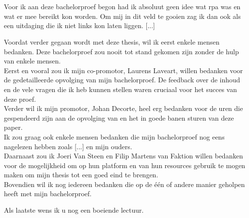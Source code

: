 
\chapter*{}
\label{ch:voorwoord}

Voor ik aan deze bachelorproef begon had ik absoluut geen idee wat \acrlong{rpa} was en wat er mee bereikt kon worden. Om mij in dit veld te gooien zag ik dan ook als een uitdaging die ik niet links kon laten liggen. [...]

Voordat verder gegaan wordt met deze thesis, wil ik eerst enkele mensen bedanken. Deze bachelorproef zou nooit tot stand gekomen zijn zonder de hulp van enkele mensen.\\
Eerst en vooral zou ik mijn co-promotor, Laurens Laveart, willen bedanken voor de gedetailleerde
opvolging van mijn bachelorproef. De feedback over de inhoud en de vele vragen die ik heb kunnen stellen waren cruciaal voor het succes van deze proef.\\
Verder wil ik mijn promotor, Johan Decorte, heel erg bedanken voor de uren die
gespendeerd zijn aan de opvolging van en het in goede banen sturen van deze paper.\\
Ik zou graag ook enkele mensen bedanken die mijn bachelorproef nog eens nagelezen hebben zoals [...] en mijn ouders.\\
Daarnaast zou ik Joeri Van Steen en Filip Martens van Faktion willen bedanken voor de mogelijkheid om op hun platform en van hun resources gebruik te mogen maken om mijn thesis tot een goed eind te brengen. \\
Bovendien wil ik nog iedereen bedanken die op de één of andere manier geholpen heeft met mijn bachelorproef.

Als laatste wens ik u nog een boeiende lectuur.

